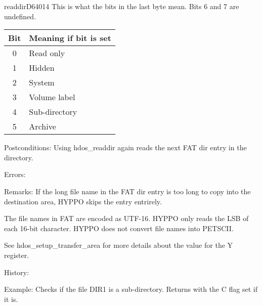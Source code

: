 \begin{hyppotrap}{readdir}{D640}{14}
  This is what the bits in the last byte mean. Bits 6 and 7 are undefined.
  {\setlength{\tabcolsep}{2mm}
  \begin{tabular}{|c|l|}
  \hline
  \textbf{Bit} & \textbf{Meaning if bit is set} \\
  \hline
  0 & Read only         \\
  1 & Hidden            \\
  2 & System            \\
  3 & Volume label      \\
  4 & Sub-directory     \\
  5 & Archive           \\
  \hline
  \end{tabular}
  }
\item [Postconditions:]
  Using hdos\_readdir again reads the next FAT dir entry in the directory.
\item [Errors:]
\item [Remarks:]
  If the long file name in the FAT dir entry is too long to copy into the
  destination area, HYPPO skips the entry entrirely.

  The file names in FAT are encoded as UTF-16. HYPPO only reads the LSB
  of each 16-bit character. HYPPO does not convert file names into
  PETSCII.

  See hdos\_setup\_transfer\_area for more details about the value for the Y
  register.
\item [History:]
\item [Example:]
  Checks if the file DIR1 is a sub-directory. Returns with the C flag set if it
  is.

  \TODO
\end{hyppotrap}


